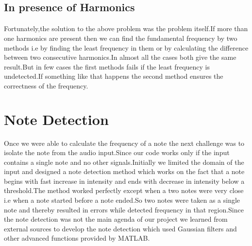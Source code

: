 \subsection{In presence of Harmonics}
\paragraph{}
Fortunately,the solution to the above problem was the problem itself.If more than one harmonics are present then we can find the fundamental frequency by two methods i.e by finding the least frequency in them or by calculating the difference between two consecutive harmonics.In almost all the cases both give the same result.But in few cases the first methods fails if the least frequency is undetected.If something like that happens the second method ensures the correctness of the frequency.
\section{Note Detection}
\paragraph{}
Once we were able to calculate the frequency of a note the next challenge was to isolate the note from the audio input.Since our code works only if the input contains a single note and no other signals.Initially we limited the domain of the input and designed a note detection method which works on the fact that a note begins with fast increase in intensity and ends with decrease in intensity below a threshold.The method worked perfectly except when a two notes were very close i.e when a note started before a note ended.So two notes were taken as a single note and thereby resulted in errors while detected frequency in that region.Since the note detection was not the main agenda of our project we learned from external sources to develop the note detection which used Gaussian filters and other advanced functions provided by MATLAB.

